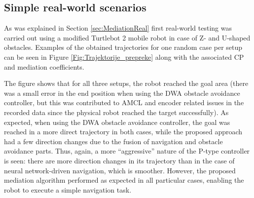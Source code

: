 \subsection{Simple real-world scenarios} \label{sec:MediationRWResults}

As was explained in Section \ref{sec:MediationReal} first real-world testing was carried out using a modified Turtlebot 2 mobile robot in case of Z- and U-shaped obstacles. Examples of the obtained trajectories for one random case per setup can be seen in Figure \ref{Fig:Trajektorije_prepreke} along with the associated CP and mediation coefficients. 

The figure shows that for all three setups, the robot reached the goal area (there was a small error in the end position when using the DWA obstacle avoidance controller, but this was contributed to AMCL and encoder related issues in the recorded data since the physical robot reached the target successfully). As expected, when using the DWA obstacle avoidance controller, the goal was reached in a more direct trajectory in both cases, while the proposed approach had a few direction changes due to the fusion of navigation and obstacle avoidance parts. Thus, again, a more ``aggressive'' nature of the P-type controller is seen: there are more direction changes in its trajectory than in the case of neural network-driven navigation, which is smoother. However, the proposed mediation algorithm performed as expected in all particular cases, enabling the robot to execute a simple navigation task. 

